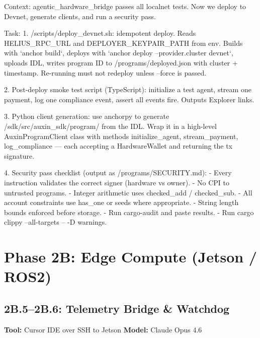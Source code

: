 \documentclass[11pt, a4paper]{article}
\begin{document}
\begin{promptbox}
Context: agentic_hardware_bridge passes all localnet tests. Now we deploy to Devnet, generate clients, and run a security pass.

Task:
1. /scripts/deploy_devnet.sh: idempotent deploy. Reads HELIUS_RPC_URL and DEPLOYER_KEYPAIR_PATH from env. Builds with `anchor build`, deploys with `anchor deploy --provider.cluster devnet`, uploads IDL, writes program ID to /programs/deployed.json with cluster + timestamp. Re-running must not redeploy unless --force is passed.

2. Post-deploy smoke test script (TypeScript): initialize a test agent, stream one payment, log one compliance event, assert all events fire. Outputs Explorer links.

3. Python client generation: use anchorpy to generate /sdk/src/auxin_sdk/program/ from the IDL. Wrap it in a high-level AuxinProgramClient class with methods initialize_agent, stream_payment, log_compliance --- each accepting a HardwareWallet and returning the tx signature.

4. Security pass checklist (output as /programs/SECURITY.md):
   - Every instruction validates the correct signer (hardware vs owner).
   - No CPI to untrusted programs.
   - Integer arithmetic uses checked_add / checked_sub.
   - All account constraints use has_one or seeds where appropriate.
   - String length bounds enforced before storage.
   - Run cargo-audit and paste results.
   - Run cargo clippy --all-targets -- -D warnings.
\end{promptbox}

\section{Phase 2B: Edge Compute (Jetson / ROS2)}

\subsection*{2B.5--2B.6: Telemetry Bridge \& Watchdog}
\textbf{Tool:} Cursor IDE over SSH to Jetson \quad \textbf{Model:} Claude Opus 4.6
\end{document}
